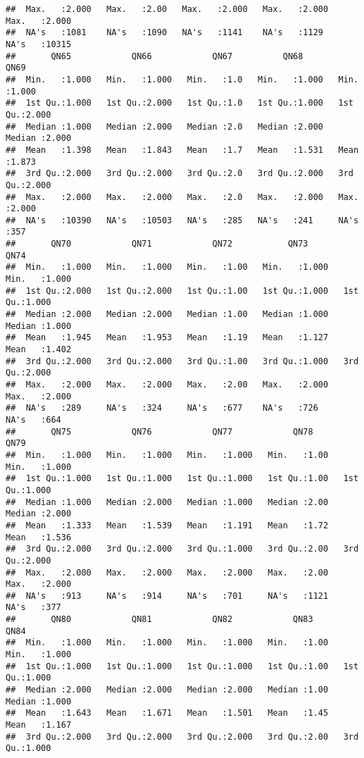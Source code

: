 \documentclass[
]{article}
\begin{document}
\begin{verbatim}
##  Max.   :2.000   Max.   :2.00   Max.   :2.000   Max.   :2.000   Max.   :2.000  
##  NA's   :1081    NA's   :1090   NA's   :1141    NA's   :1129    NA's   :10315  
##       QN65            QN66            QN67          QN68            QN69      
##  Min.   :1.000   Min.   :1.000   Min.   :1.0   Min.   :1.000   Min.   :1.000  
##  1st Qu.:1.000   1st Qu.:2.000   1st Qu.:1.0   1st Qu.:1.000   1st Qu.:2.000  
##  Median :1.000   Median :2.000   Median :2.0   Median :2.000   Median :2.000  
##  Mean   :1.398   Mean   :1.843   Mean   :1.7   Mean   :1.531   Mean   :1.873  
##  3rd Qu.:2.000   3rd Qu.:2.000   3rd Qu.:2.0   3rd Qu.:2.000   3rd Qu.:2.000  
##  Max.   :2.000   Max.   :2.000   Max.   :2.0   Max.   :2.000   Max.   :2.000  
##  NA's   :10390   NA's   :10503   NA's   :285   NA's   :241     NA's   :357    
##       QN70            QN71            QN72           QN73            QN74      
##  Min.   :1.000   Min.   :1.000   Min.   :1.00   Min.   :1.000   Min.   :1.000  
##  1st Qu.:2.000   1st Qu.:2.000   1st Qu.:1.00   1st Qu.:1.000   1st Qu.:1.000  
##  Median :2.000   Median :2.000   Median :1.00   Median :1.000   Median :1.000  
##  Mean   :1.945   Mean   :1.953   Mean   :1.19   Mean   :1.127   Mean   :1.402  
##  3rd Qu.:2.000   3rd Qu.:2.000   3rd Qu.:1.00   3rd Qu.:1.000   3rd Qu.:2.000  
##  Max.   :2.000   Max.   :2.000   Max.   :2.00   Max.   :2.000   Max.   :2.000  
##  NA's   :289     NA's   :324     NA's   :677    NA's   :726     NA's   :664    
##       QN75            QN76            QN77            QN78           QN79      
##  Min.   :1.000   Min.   :1.000   Min.   :1.000   Min.   :1.00   Min.   :1.000  
##  1st Qu.:1.000   1st Qu.:1.000   1st Qu.:1.000   1st Qu.:1.00   1st Qu.:1.000  
##  Median :1.000   Median :2.000   Median :1.000   Median :2.00   Median :2.000  
##  Mean   :1.333   Mean   :1.539   Mean   :1.191   Mean   :1.72   Mean   :1.536  
##  3rd Qu.:2.000   3rd Qu.:2.000   3rd Qu.:1.000   3rd Qu.:2.00   3rd Qu.:2.000  
##  Max.   :2.000   Max.   :2.000   Max.   :2.000   Max.   :2.00   Max.   :2.000  
##  NA's   :913     NA's   :914     NA's   :701     NA's   :1121   NA's   :377    
##       QN80            QN81            QN82            QN83           QN84      
##  Min.   :1.000   Min.   :1.000   Min.   :1.000   Min.   :1.00   Min.   :1.000  
##  1st Qu.:1.000   1st Qu.:1.000   1st Qu.:1.000   1st Qu.:1.00   1st Qu.:1.000  
##  Median :2.000   Median :2.000   Median :2.000   Median :1.00   Median :1.000  
##  Mean   :1.643   Mean   :1.671   Mean   :1.501   Mean   :1.45   Mean   :1.167  
##  3rd Qu.:2.000   3rd Qu.:2.000   3rd Qu.:2.000   3rd Qu.:2.00   3rd Qu.:1.000  

\end{verbatim}
\end{document}
